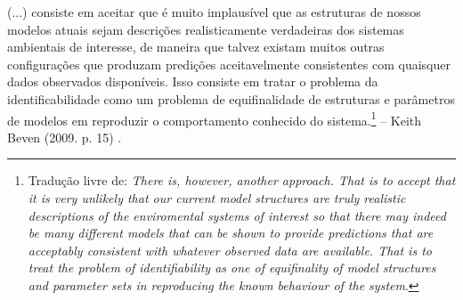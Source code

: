 \documentclass[./main.tex]{subfiles}
\begin{document}
\begin{adjustwidth}{100pt}{0pt}
\medskip
\small (...) consiste em aceitar que é muito implausível que as estruturas de nossos modelos atuais sejam descrições realisticamente verdadeiras dos sistemas ambientais de interesse, de maneira que talvez existam muitos outras configurações que produzam predições aceitavelmente consistentes com quaisquer dados observados disponíveis. Isso consiste em tratar o problema da identificabilidade como um problema de equifinalidade de estruturas e parâmetros de modelos em reproduzir o comportamento conhecido do sistema.\footnote{Tradução livre de: \textit{There is, however, another approach. That is to accept that it is very unlikely that our current model structures are truly realistic descriptions of the enviromental systems of interest so that there may indeed be many different models that can be shown to provide predictions that are acceptably consistent with whatever observed data are available. That is to treat the problem of identifiability as one of equifinality of model structures and parameter sets in reproducing the known behaviour of the system}.} -- Keith Beven (2009. p. 15) \cite{Beven2009}.
\medskip
\end{adjustwidth}
\end{document}
